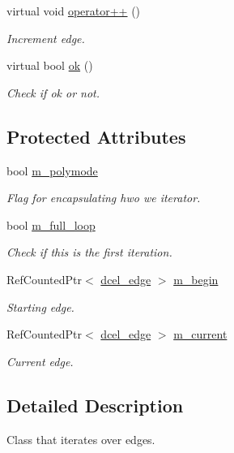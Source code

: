 \begin{DoxyCompactItemize}
virtual void \hyperlink{classedge__iterator_a3097f523b0fe8bb940d2ceb76b2c817c}{operator++} ()
\begin{DoxyCompactList}\small\item\em Increment edge. \end{DoxyCompactList}\item 
virtual bool \hyperlink{classedge__iterator_ac14f7995a03f56dda06a5108b21897d4}{ok} ()
\begin{DoxyCompactList}\small\item\em Check if ok or not. \end{DoxyCompactList}\end{DoxyCompactItemize}
\subsection*{Protected Attributes}
\begin{DoxyCompactItemize}
\item 
bool \hyperlink{classedge__iterator_acd0bfd3a365cbf562f6a993cef83aab6}{m\+\_\+polymode}
\begin{DoxyCompactList}\small\item\em Flag for encapsulating hwo we iterator. \end{DoxyCompactList}\item 
bool \hyperlink{classedge__iterator_a657a86b5eecd08e6bb2258a492f28870}{m\+\_\+full\+\_\+loop}
\begin{DoxyCompactList}\small\item\em Check if this is the first iteration. \end{DoxyCompactList}\item 
Ref\+Counted\+Ptr$<$ \hyperlink{classdcel__edge}{dcel\+\_\+edge} $>$ \hyperlink{classedge__iterator_a0bda1c5b340764193afcaf9d93d143d4}{m\+\_\+begin}
\begin{DoxyCompactList}\small\item\em Starting edge. \end{DoxyCompactList}\item 
Ref\+Counted\+Ptr$<$ \hyperlink{classdcel__edge}{dcel\+\_\+edge} $>$ \hyperlink{classedge__iterator_aa837bc5b84b3c957bde516c729fbb279}{m\+\_\+current}
\begin{DoxyCompactList}\small\item\em Current edge. \end{DoxyCompactList}\end{DoxyCompactItemize}


\subsection{Detailed Description}
Class that iterates over edges. 

